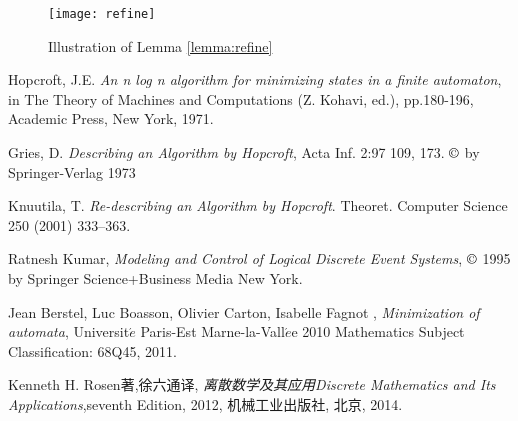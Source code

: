 \begin{figure}[htbp]
	\texttt{[image: refine]}
	\caption{Illustration of Lemma \ref{lemma:refine}}
	\label{fig:refine}
\end{figure}

\begin{thebibliography}{99}
	Hopcroft, J.E. \textit{An n log n algorithm for minimizing states in a finite automaton}, in The Theory of Machines and Computations (Z. Kohavi, ed.), pp.180-196, Academic Press, New York, 1971.
	
	Gries, D. \textit{Describing an Algorithm by Hopcroft}, Acta Inf. 2:97 109, 173. $\copyright$ by Springer-Verlag 1973
	
	Knuutila, T. \textit{Re-describing an Algorithm by Hopcroft}. Theoret. Computer Science 250 (2001) 333--363.
		
	Ratnesh Kumar, \textit{Modeling and Control of Logical Discrete Event Systems}, $\copyright$ 1995 by Springer Science+Business Media New York.
	
	Jean Berstel, Luc Boasson, Olivier Carton, Isabelle Fagnot
	, \textit{Minimization of automata}, Universit$\acute{e}$ Paris-Est Marne-la-Vall$\acute{e}$e 2010 Mathematics Subject Classification: 68Q45, 2011.
	
	Kenneth H. Rosen著,徐六通译, \textit{离散数学及其应用Discrete Mathematics and Its Applications},seventh Edition, 2012, 机械工业出版社, 北京, 2014.
	
\end{thebibliography}

